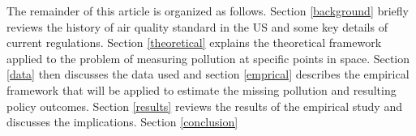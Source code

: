 \documentclass[12pt]{article}
\begin{document}












The remainder of this article is organized as follows. Section \ref{background} briefly reviews the history of air quality standard in the US and some key details of current regulations. Section \ref{theoretical} explains the theoretical framework applied to the problem of measuring pollution at specific points in space. Section \ref{data} then discusses the data used and section \ref{emprical} describes the empirical framework that will be applied to estimate the missing pollution and resulting policy outcomes. Section \ref{results} reviews the results of the empirical study and discusses the implications. Section \ref{conclusion}
\end{document}
